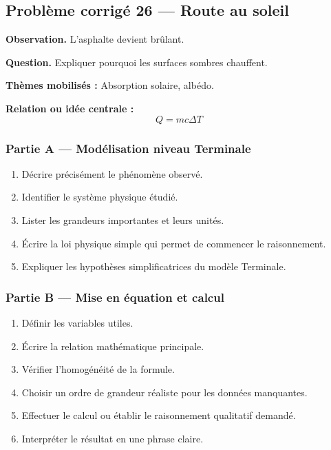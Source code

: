 \documentclass[11pt,a4paper]{article}
\begin{document}
\subsection{Problème corrigé 26 — Route au soleil}

\begin{exercicebox}
\textbf{Observation.} L'asphalte devient brûlant.

\medskip
\textbf{Question.} Expliquer pourquoi les surfaces sombres chauffent.

\medskip
\textbf{Thèmes mobilisés :} Absorption solaire, albédo.

\medskip
\textbf{Relation ou idée centrale :}
\[
Q=mc\Delta T
\]
\end{exercicebox}

\subsubsection*{Partie A — Modélisation niveau Terminale}

\begin{enumerate}
  \item Décrire précisément le phénomène observé.
  \item Identifier le système physique étudié.
  \item Lister les grandeurs importantes et leurs unités.
  \item Écrire la loi physique simple qui permet de commencer le raisonnement.
  \item Expliquer les hypothèses simplificatrices du modèle Terminale.
\end{enumerate}

\subsubsection*{Partie B — Mise en équation et calcul}

\begin{enumerate}
  \item Définir les variables utiles.
  \item Écrire la relation mathématique principale.
  \item Vérifier l'homogénéité de la formule.
  \item Choisir un ordre de grandeur réaliste pour les données manquantes.
  \item Effectuer le calcul ou établir le raisonnement qualitatif demandé.
  \item Interpréter le résultat en une phrase claire.
\end{enumerate}
\end{document}
